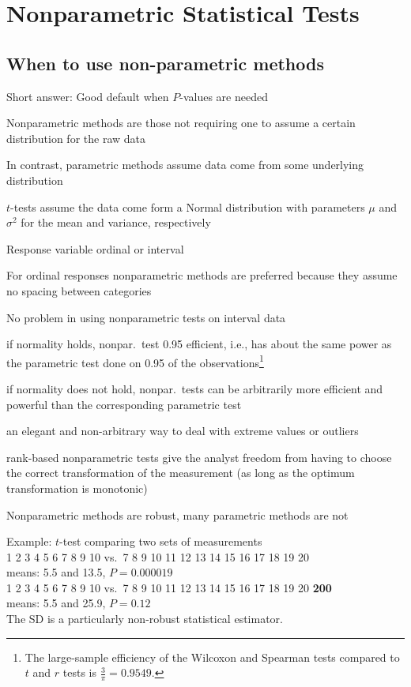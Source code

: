 
%
%

\chapter{Nonparametric Statistical Tests}
\section{When to use non-parametric methods}
\bi
\item Short answer: Good default when $P$-values are needed
\item Nonparametric methods are those not requiring one to assume a
  certain distribution for the raw data
  \bi
  \item In contrast, parametric methods assume data come from some underlying distribution
  \item $t$-tests assume the data come form a Normal distribution with parameters $\mu$ and $\sigma^2$ for the mean and variance, respectively
  \ei
\item Response variable ordinal or interval
\item For ordinal responses nonparametric methods are preferred
  because they assume no spacing between categories
\item No problem in using nonparametric tests on interval data
 \bi
 \item if normality holds, nonpar.\ test 0.95 efficient, i.e., has
   about the same power as the parametric test done on 0.95 of the
   observations\footnote{The large-sample efficiency of the Wilcoxon
     and Spearman tests compared to $t$ and $r$ tests is
     $\frac{3}{\pi} = 0.9549$.}
 \item if normality does not hold, nonpar.\ tests can be arbitrarily
   more efficient and powerful than the corresponding parametric test 
 \item an elegant and non-arbitrary way to deal with extreme values or
   outliers
 \item rank-based nonparametric tests give the analyst freedom from
   having to choose the correct transformation of the measurement (as
   long as the optimum transformation is monotonic)
 \ei
\item Nonparametric methods are robust, many parametric methods are
  not
 \bi
 \item Example: $t$-test comparing two sets of measurements\\
   1 2 3 4 5 6 7 8 9 10 \hfill vs.\ \hfill 7 8 9 10 11 12 13 14 15 16
   17 18 19 20\\
   means: 5.5 and 13.5, $P=0.000019$\\
   1 2 3 4 5 6 7 8 9 10 \hfill vs.\ \hfill 7 8 9 10 11 12 13 14 15 16
   17 18 19 20 \textbf{200}\\
   means: 5.5 and 25.9, $P=0.12$\\
   The SD is a particularly non-robust statistical estimator.
  \ei

